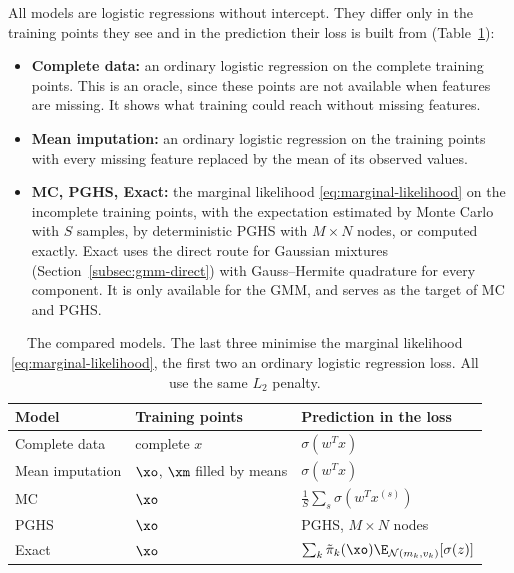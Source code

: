 All models are logistic regressions without intercept. They differ only in the
training points they see and in the prediction their loss is built from
(Table~\ref{tab:training-models}):
\begin{itemize}
  \item \textbf{Complete data:} an ordinary logistic regression on the complete
        training points. This is an oracle, since these points are not available
        when features are missing. It shows what training could reach without
        missing features.
  \item \textbf{Mean imputation:} an ordinary logistic regression on the training
        points with every missing feature replaced by the mean of its observed
        values.
  \item \textbf{MC, PGHS, Exact:} the marginal likelihood \eqref{eq:marginal-likelihood}
        on the incomplete training points, with the expectation estimated by Monte
        Carlo with $S$ samples, by deterministic PGHS with $M \times N$ nodes, or
        computed exactly. Exact uses the direct route for Gaussian mixtures
        (Section~\ref{subsec:gmm-direct}) with Gauss--Hermite quadrature for every
        component. It is only available for the GMM, and serves as the target of
        MC and PGHS.
\end{itemize}

\begin{table}[htb]
\centering
\small
\renewcommand{\arraystretch}{1.3}
\begin{tabular}{lll}
\hline
\textbf{Model} & \textbf{Training points} & \textbf{Prediction in the loss} \\
\hline
Complete data   & complete $x$                 & $\sigma(w^T x)$ \\
Mean imputation & $\xo$, $\xm$ filled by means & $\sigma(w^T x)$ \\
MC              & $\xo$                        & $\frac{1}{S}\sum_s \sigma(w^T x^{(s)})$ \\
PGHS            & $\xo$                        & PGHS, $M \times N$ nodes \\
Exact           & $\xo$                        & $\sum_k \tilde\pi_k(\xo) \E_{\mathcal{N}(m_k, v_k)}[\sigma(z)]$ \\
\hline
\end{tabular}
\caption{The compared models. The last three minimise the marginal likelihood
  \eqref{eq:marginal-likelihood}, the first two an ordinary logistic regression
  loss. All use the same $L_2$ penalty.}
\label{tab:training-models}
\end{table}

